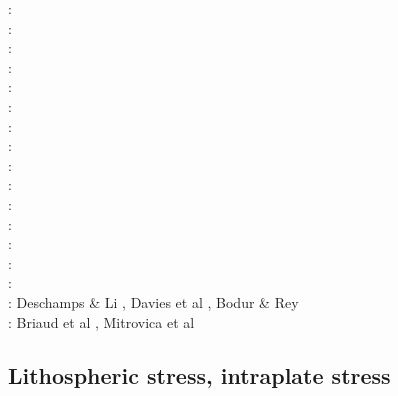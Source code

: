 \begin{scriptsize}
\nineteeneightyfive: \cite{hacr85}\\
\nineteeneightyseven: \cite{repa87}\\
\nineteenninetytwo: \cite{kiha92}\\
\nineteenninetythree: \cite{gurn93}\cite{gurn93b}\\
\nineteenninetynine: \cite{bumo99}\\
\twothousandthree: \cite{cogu03}\\
\twothousandnine: \cite{cohu09}\\
\twothousandten: \cite{bofb10}\cite{brau10}\cite{stfh10}\cite{shml10}\\
\twothousandeleven: \cite{rapy11}\\
\twothousandtwelve: \cite{shlm12}\cite{zhzf12}\\
\twothousandthirteen: \cite{brrs13}\cite{flgm13}\\
\twothousandfifteen: \cite{aupm15}\cite{kiff15}\cite{dali15}\\
\twothousandsixteen: \cite{howa16}\cite{gvfb16}\cite{yagu16}\cite{stei16}\cite{cogb16}\\
\twothousandseventeen: \cite{yamm17}\cite{aumh17}\cite{grrb17}\\
\twothousandeighteen: \cite{osss18}\cite{vibc18}\\
\twothousandnineteen: Deschamps \& Li \cite{deli19}, Davies et al \cite{davk19}, Bodur \& Rey \cite{bore19}\\
\twothousandtwenty: Briaud et al \cite{braf20}, Mitrovica et al \cite{miac20}
\end{scriptsize}


\subsection{Lithospheric stress, intraplate stress}

